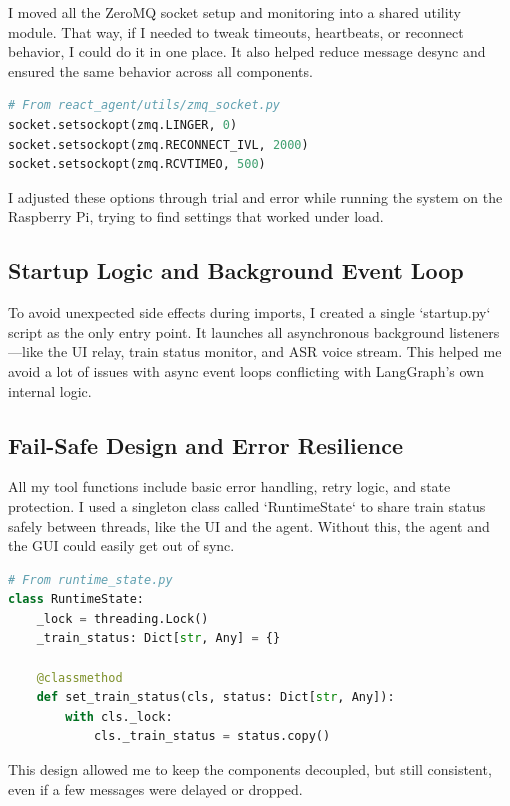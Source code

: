 I moved all the ZeroMQ socket setup and monitoring into a shared utility module. That way, if I needed to tweak timeouts, heartbeats, or reconnect behavior, I could do it in one place. It also helped reduce message desync and ensured the same behavior across all components.

\begin{lstlisting}[language=Python, caption={ZeroMQ socket configuration (excerpt)}]
# From react_agent/utils/zmq_socket.py
socket.setsockopt(zmq.LINGER, 0)
socket.setsockopt(zmq.RECONNECT_IVL, 2000)
socket.setsockopt(zmq.RCVTIMEO, 500)
\end{lstlisting}

I adjusted these options through trial and error while running the system on the Raspberry Pi, trying to find settings that worked under load.

\subsection{Startup Logic and Background Event Loop}

To avoid unexpected side effects during imports, I created a single `startup.py` script as the only entry point. It launches all asynchronous background listeners—like the UI relay, train status monitor, and ASR voice stream. This helped me avoid a lot of issues with async event loops conflicting with LangGraph’s own internal logic.

\subsection{Fail-Safe Design and Error Resilience}

All my tool functions include basic error handling, retry logic, and state protection. I used a singleton class called `RuntimeState` to share train status safely between threads, like the UI and the agent. Without this, the agent and the GUI could easily get out of sync.

\begin{lstlisting}[language=Python, caption={Runtime-safe state update}]
# From runtime_state.py
class RuntimeState:
    _lock = threading.Lock()
    _train_status: Dict[str, Any] = {}

    @classmethod
    def set_train_status(cls, status: Dict[str, Any]):
        with cls._lock:
            cls._train_status = status.copy()
\end{lstlisting}

This design allowed me to keep the components decoupled, but still consistent, even if a few messages were delayed or dropped.



